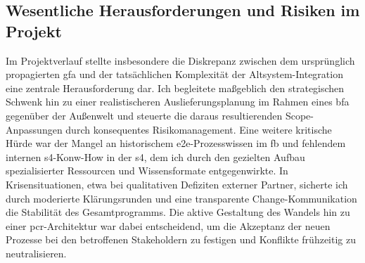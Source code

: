 \subsection{Wesentliche Herausforderungen und Risiken im Projekt}
\label{subsec:WesentlicheHerausforderungen}

\par Im Projektverlauf stellte insbesondere die Diskrepanz zwischen dem ursprünglich propagierten \gls{gfa} und der tatsächlichen Komplexität der Altsystem-Integration eine zentrale Herausforderung dar. Ich begleitete maßgeblich den strategischen Schwenk hin zu einer realistischeren Auslieferungsplanung im Rahmen eines \gls{bfa} gegenüber der Außenwelt und steuerte die daraus resultierenden Scope-Anpassungen durch konsequentes Risikomanagement. Eine weitere kritische Hürde war der Mangel an historischem \gls{e2e}-Prozesswissen im \gls{fb} und fehlendem internen \gls{s4}-Konw-How in der \gls{s4}, dem ich durch den gezielten Aufbau spezialisierter Ressourcen und Wissensformate entgegenwirkte. In Krisensituationen, etwa bei qualitativen Defiziten externer Partner, sicherte ich durch moderierte Klärungsrunden und eine transparente Change-Kommunikation die Stabilität des Gesamtprogramms. Die aktive Gestaltung des Wandels hin zu einer \gls{pcr}-Architektur war dabei entscheidend, um die Akzeptanz der neuen Prozesse bei den betroffenen Stakeholdern zu festigen und Konflikte frühzeitig zu neutralisieren.

